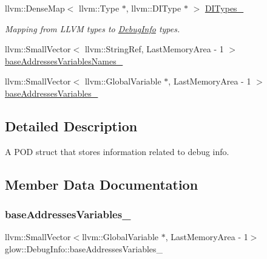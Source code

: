 \begin{DoxyCompactItemize}
\mbox{\label{structglow_1_1_debug_info_a9c2343cf4b47b197d170bc240ec1ba4a}} 
llvm\+::\+Dense\+Map$<$ llvm\+::\+Type $\ast$, llvm\+::\+D\+I\+Type $\ast$ $>$ \hyperlink{structglow_1_1_debug_info_a9c2343cf4b47b197d170bc240ec1ba4a}{D\+I\+Types\+\_\+}
\begin{DoxyCompactList}\small\item\em Mapping from L\+L\+VM types to \hyperlink{structglow_1_1_debug_info}{Debug\+Info} types. \end{DoxyCompactList}\item 
llvm\+::\+Small\+Vector$<$ llvm\+::\+String\+Ref, Last\+Memory\+Area -\/ 1 $>$ \hyperlink{structglow_1_1_debug_info_aedd8c89215db736c9099b56e0c318c72}{base\+Addresses\+Variables\+Names\+\_\+}
\item 
llvm\+::\+Small\+Vector$<$ llvm\+::\+Global\+Variable $\ast$, Last\+Memory\+Area -\/ 1 $>$ \hyperlink{structglow_1_1_debug_info_a717459e7223f04f86cd58a62445a92c0}{base\+Addresses\+Variables\+\_\+}
\end{DoxyCompactItemize}


\subsection{Detailed Description}
A P\+OD struct that stores information related to debug info. 

\subsection{Member Data Documentation}
\mbox{\label{structglow_1_1_debug_info_a717459e7223f04f86cd58a62445a92c0}} 
\subsubsection{\texorpdfstring{base\+Addresses\+Variables\+\_\+}{baseAddressesVariables\_}}
{\footnotesize\ttfamily llvm\+::\+Small\+Vector$<$llvm\+::\+Global\+Variable $\ast$, Last\+Memory\+Area -\/ 1$>$ glow\+::\+Debug\+Info\+::base\+Addresses\+Variables\+\_\+}

